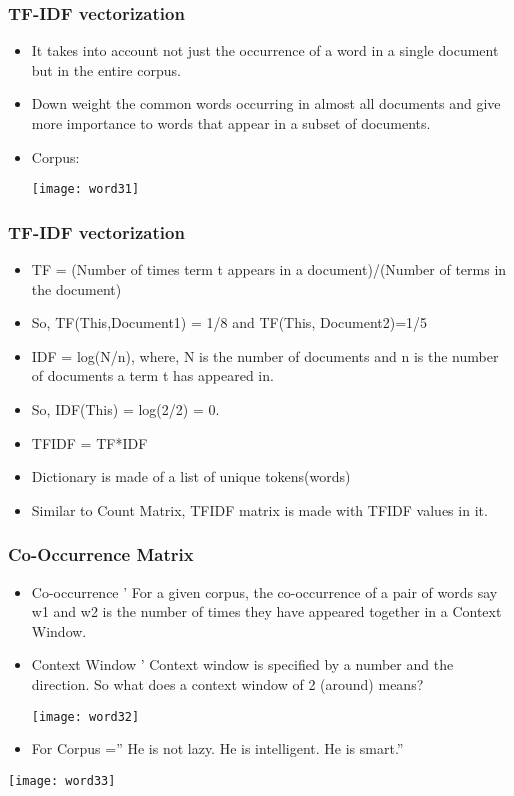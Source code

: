 \begin{frame}[fragile]\frametitle{TF-IDF vectorization}
\begin{itemize}
\item It takes into account not just the occurrence of a word in a single document but in the entire corpus.
\item Down weight the common words occurring in almost all documents and give more importance to words that appear in a subset of documents.
\item Corpus:
\begin{center}
\texttt{[image: word31]}
\end{center}
\end{itemize}
\end{frame}

\begin{frame}[fragile]\frametitle{TF-IDF vectorization}
\begin{itemize}
\item TF = (Number of times term t appears in a document)/(Number of terms in the document)
\item So, TF(This,Document1) = 1/8  and TF(This, Document2)=1/5
\item IDF = log(N/n), where, N is the number of documents and n is the number of documents a term t has appeared in.
\item So, IDF(This) = log(2/2) = 0.
\item TFIDF = TF*IDF
\item Dictionary is made of a list of unique tokens(words) 
\item Similar to Count Matrix, TFIDF matrix is made with TFIDF values in it.
\end{itemize}
\end{frame}


\begin{frame}[fragile]\frametitle{Co-Occurrence Matrix}
\begin{itemize}
\item Co-occurrence ' For a given corpus, the co-occurrence of a pair of words say w1 and w2 is the number of times they have appeared together in a Context Window.
\item Context Window ' Context window is specified by a number and the direction. So what does a context window of 2 (around) means?
\begin{center}
\texttt{[image: word32]}
\end{center}
\item For Corpus ='' He is not lazy. He is intelligent. He is smart.''
\end{itemize}
\begin{center}
\texttt{[image: word33]}
\end{center}
\end{frame}

